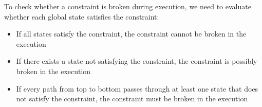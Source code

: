 \begin{multicols*}{2}
\noindent To check whether a constraint is broken during execution, we need to evaluate whether each global state satisfies the constraint:
\begin{itemize}
  \item If all states satisfy the constraint, the constraint cannot be broken in the execution
  \item If there exists a state not satisfying the constraint, the constraint is possibly broken in the execution
  \item If every path from top to bottom passes through at least one state that does not satisfy the constraint, the constraint must be broken in the execution
\end{itemize}

\end{multicols*}
